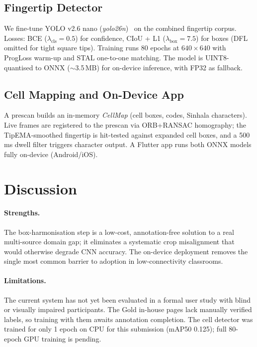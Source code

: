 \documentclass{article}
\begin{document}
\subsection{Fingertip Detector}

We fine-tune YOLO v2.6 nano (\textit{yolo26n})~\cite{yolov8} on the
combined fingertip corpus.  Losses: BCE ($\lambda_\text{cls}{=}0.5$) for
confidence, CIoU + L1 ($\lambda_\text{box}{=}7.5$) for boxes (DFL omitted
for tight square tips).  Training runs 80 epochs at $640\times640$ with
ProgLoss warm-up and STAL one-to-one matching.  The model is UINT8-quantised
to ONNX ($\sim$3.5\,MB) for on-device inference, with FP32 as fallback.

\subsection{Cell Mapping and On-Device App}

A prescan builds an in-memory \textit{CellMap} (cell boxes, codes, Sinhala
characters).  Live frames are registered to the prescan via ORB+RANSAC
homography; the TipEMA-smoothed fingertip is hit-tested against expanded
cell boxes, and a 500\,ms dwell filter triggers character output.  A
Flutter app runs both ONNX models fully on-device (Android/iOS).

\section{Discussion}

\paragraph{Strengths.} The box-harmonisation step is a low-cost, annotation-free
solution to a real multi-source domain gap; it eliminates a systematic crop
misalignment that would otherwise degrade CNN accuracy.  The on-device
deployment removes the single most common barrier to adoption in
low-connectivity classrooms.

\paragraph{Limitations.} The current system has not yet been evaluated in a
formal user study with blind or visually impaired participants.  The Gold
in-house pages lack manually verified labels, so training with them awaits
annotation completion.  The cell detector was trained for only 1 epoch on
CPU for this submission (mAP50 0.125); full 80-epoch GPU training is
pending.
\end{document}
